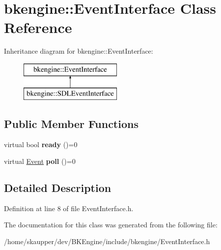 \hypertarget{classbkengine_1_1EventInterface}{}\section{bkengine\+:\+:Event\+Interface Class Reference}
\label{classbkengine_1_1EventInterface}
Inheritance diagram for bkengine\+:\+:Event\+Interface\+:\begin{figure}[H]
\begin{center}
\leavevmode
\includegraphics[height=2.000000cm]{classbkengine_1_1EventInterface}
\end{center}
\end{figure}
\subsection*{Public Member Functions}
\begin{DoxyCompactItemize}
\item 
\mbox{\label{classbkengine_1_1EventInterface_ab4a68c0c0ca6b55d538afbbb14445345}} 
virtual bool {\bfseries ready} ()=0
\item 
\mbox{\label{classbkengine_1_1EventInterface_a2fdf99cc68cc5e12f03cc73634e7b500}} 
virtual \hyperlink{classbkengine_1_1Event}{Event} {\bfseries poll} ()=0
\end{DoxyCompactItemize}


\subsection{Detailed Description}


Definition at line 8 of file Event\+Interface.\+h.



The documentation for this class was generated from the following file\+:\begin{DoxyCompactItemize}
\item 
/home/skaupper/dev/\+B\+K\+Engine/include/bkengine/Event\+Interface.\+h\end{DoxyCompactItemize}
